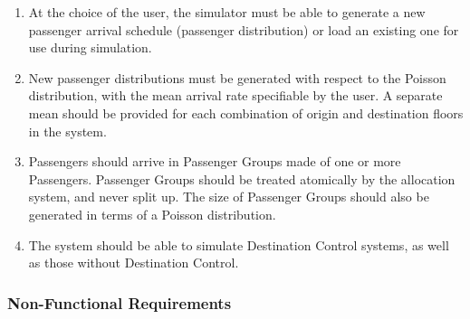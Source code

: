 \documentclass{UoYCSproject}
\begin{document}
\begin{enumerate}
\begin{enumerate}
		\end{enumerate}
		\item At the choice of the user, the simulator must be able to generate a new passenger arrival schedule (passenger distribution) or load an existing one for use during simulation.
		\item New passenger distributions must be generated with respect to the Poisson distribution, with the mean arrival rate specifiable by the user.  A separate mean should be provided for each combination of origin and destination floors in the system.
		\item Passengers should arrive in Passenger Groups made of one or more Passengers.  Passenger Groups should be treated atomically by the allocation system, and never split up.  The size of Passenger Groups should also be generated in terms of a Poisson distribution.
		\item The system should be able to simulate Destination Control systems, as well as those without Destination Control.
	\end{enumerate}

\subsubsection{Non-Functional Requirements}
\end{document}
